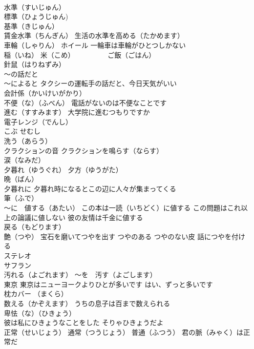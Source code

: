 \documentclass[8pt]{extreport}
\begin{document}
\begin{CJK}{UTF8}{min}
\\	水準（すいじゅん）
\\	標準（ひょうじゅん) 
\\	基準（きじゅん）
\\	賃金水準（ちんぎん） 生活の水準を高める（たかめます）
\\	車輪（しゃりん） ホイール 一輪車は車輪がひとつしかない
\\	稲（いね） 米（こめ）　　　　　 ご飯（ごはん）
\\	針鼠（はりねずみ）
\\	～の話だと 
\\	～によると タクシーの運転手の話だと、今日天気がいい
\\	会計係（かいけいがかり）
\\	不便（な）（ふべん） 電話がないのは不便なことです
\\	進む（すすみます） 大学院に進むつもりですか
\\	電子レンジ（でんし）
\\	こぶ せむし
\\	洗う（あらう）
\\	クラクションの音 クラクションを鳴らす（ならす）
\\	涙（なみだ）
\\	夕暮れ（ゆうぐれ） 夕方（ゆうがた）
\\	晩（ばん）
\\	夕暮れに 夕暮れ時になるとこの辺に人々が集まってくる
\\	筆（ふで）
\\	～に　値する（あたい） この本は一読（いちどく）に値する この問題はこれ以上の論議に値しない 彼の友情は千金に値する
\\	戻る（もどります）
\\	艶（つや） 宝石を磨いてつやを出す つやのある つやのない皮 話につやを付ける
\\	ステレオ
\\	サフラン
\\	汚れる（よごれます） ～を　汚す（よごします）
\\	東京 東京はニューヨークよりひとが多いです はい、ずっと多いです
\\	枕カバー （まくら）
\\	数える（かぞえます） うちの息子は百まで数えられる
\\	卑怯（な）（ひきょう） 
\\	彼は私にひきょうなことをした そりゃひきょうだよ
\\	正常（せいじょう） 通常（つうじょう） 普通（ふつう） 君の脈（みゃく）は正常だ

\end{CJK}
\end{document}
